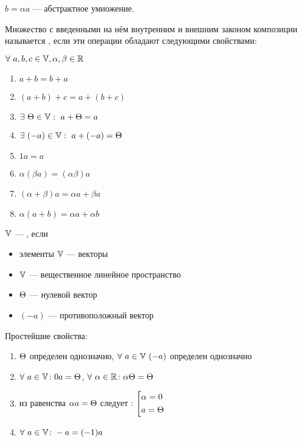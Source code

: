 $b=\alpha{}a$ --- абстрактное умножение.

\begin{opred}
Множество с введенными на нём внутренним и внешним законом композиции называется , если эти операции обладают следующими свойствами:

$\forall\ a,b,c\in\mathbb{V}, \alpha,\beta\in\mathbb{R}$
\begin{enumerate}
\item $a+b=b+a$
\item $(a+b)+c=a+(b+c)$
\item $\exists\ \T\in\V:\ a+\T=a$
\item $\exists\ (-a)\in\V:\ a+(-a)=\T$
\item $1a=a$
\item $\alpha(\beta{}a)=(\alpha\beta)a$
\item $(\alpha+\beta)a=\alpha{}a+\beta{}a$
\item $\alpha(a+b)=\alpha{}a+\alpha{}b$
\end{enumerate}
\end{opred}
\begin{opred}
$\mathbb{V}$ --- , если \begin{itemize}
\item элементы $\mathbb{V}$ --- векторы
\item $\mathbb{V}$ --- вещественное линейное пространство
\item $\Theta$ --- нулевой вектор
\item $(-a)$ --- противоположный вектор
\end{itemize}
\end{opred}
\begin{theor}
Простейшие свойства:\begin{enumerate}
\item $\Theta$ определен однозначно, $\forall\ a\in\mathbb{V}\ (-a)$ определен однозначно
\item $\forall\ a\in\mathbb{V}\colon 0a=\Theta$, $\forall\ \alpha\in\mathbb{R}\colon \alpha\Theta=\Theta$
\item из равенства $\alpha{}a=\Theta$ следует : $\left[\begin{aligned}
&\alpha=0 \\
&a=\Theta
\end{aligned}\right.$
\item $\forall\ a\in\mathbb{V}\colon -a=(-1)a$
\end{enumerate}
\end{theor}
